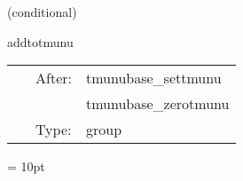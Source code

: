 \documentclass{article}
\begin{document}
\vspace{5mm}

   (conditional) 

\hspace{5mm} addtotmunu 

\hspace{5mm}{\it add to the stress-energy tensor here } 


\hspace{5mm}

 \begin{tabular*}{160mm}{cll} 
~ & After:  & tmunubase\_settmunu \\ 
~& ~ &tmunubase\_zerotmunu\\ 
~ & Type:  & group \\ 
\end{tabular*} 



\vspace{5mm}\parskip = 10pt 
\end{document}
